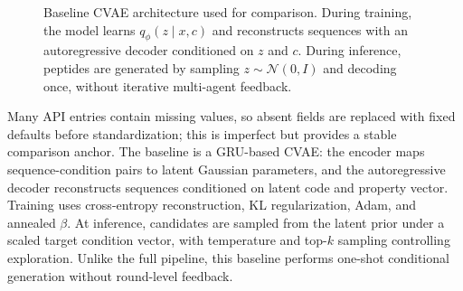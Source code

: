 \begin{figure}[H]
{
}
\caption{Baseline CVAE architecture used for comparison. During training, the model learns $q_{\phi}(z\mid x,c)$ and reconstructs sequences with an autoregressive decoder conditioned on $z$ and $c$. During inference, peptides are generated by sampling $z\sim\mathcal{N}(0,I)$ and decoding once, without iterative multi-agent feedback.}
\label{fig:baseline_cvae}
\end{figure}


Many API entries contain missing values, so absent fields are replaced with fixed defaults before standardization; this is imperfect but provides a stable comparison anchor. The baseline is a GRU-based CVAE: the encoder maps sequence-condition pairs to latent Gaussian parameters, and the autoregressive decoder reconstructs sequences conditioned on latent code and property vector. Training uses cross-entropy reconstruction, KL regularization, Adam, and annealed $\beta$. At inference, candidates are sampled from the latent prior under a scaled target condition vector, with temperature and top-$k$ sampling controlling exploration. Unlike the full pipeline, this baseline performs one-shot conditional generation without round-level feedback.
